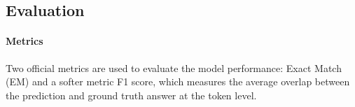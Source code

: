 \documentclass[letterpaper]{article} %
\begin{document}





\subsection{Evaluation}

\paragraph{Metrics} Two official metrics are used to evaluate the model performance: Exact Match (EM) and a softer metric F1 score, which measures the average overlap between the prediction and ground truth answer at the token level. 
\end{document}
